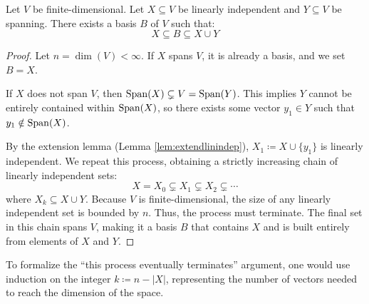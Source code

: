 \documentclass[../linear_algebra_and_groups.tex]{subfiles}
\begin{document}
\begin{corollary}
    \begin{shaded*}
        Let $V$ be finite-dimensional. Let $X \subseteq V$ be linearly independent and $Y \subseteq V$ be spanning. There exists a basis $B$ of $V$ such that:
        \[ X \subseteq B \subseteq X \cup Y \]
    \end{shaded*}
\end{corollary}
\begin{proof}
    Let $n = \dim(V) < \infty$. If $X$ spans $V$, it is already a basis, and we set $B = X$. 
    
    If $X$ does not span $V$, then $\operatorname{Span}(X) \subsetneq V = \operatorname{Span}(Y)$. This implies $Y$ cannot be entirely contained within $\operatorname{Span}(X)$, so there exists some vector $y_1 \in Y$ such that $y_1 \notin \operatorname{Span}(X)$. 
    
    By the extension lemma (Lemma \ref{lem:extendlinindep}), $X_1 \coloneqq X \cup \{y_1\}$ is linearly independent. We repeat this process, obtaining a strictly increasing chain of linearly independent sets:
    \[ X = X_0 \subsetneq X_1 \subsetneq X_2 \subsetneq \cdots \]
    where $X_k \subseteq X \cup Y$. Because $V$ is finite-dimensional, the size of any linearly independent set is bounded by $n$. Thus, the process must terminate. The final set in this chain spans $V$, making it a basis $B$ that contains $X$ and is built entirely from elements of $X$ and $Y$.
    \qedhere
\end{proof}

\begin{remark}
    To formalize the ``this process eventually terminates'' argument, one would use induction on the integer $k \coloneqq n - |X|$, representing the number of vectors needed to reach the dimension of the space.
\end{remark}
\end{document}
